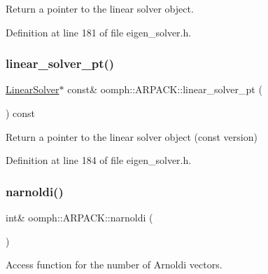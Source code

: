 Return a pointer to the linear solver object. 



Definition at line 181 of file eigen\+\_\+solver.\+h.

\mbox{\label{classoomph_1_1ARPACK_a48d9a6ff92914c0126dbfa85815b7d1f}} 
\subsubsection{\texorpdfstring{linear\+\_\+solver\+\_\+pt()}{linear\_solver\_pt()}\hspace{0.1cm}{\footnotesize\ttfamily [2/2]}}
{\footnotesize\ttfamily \hyperlink{classoomph_1_1LinearSolver}{Linear\+Solver}$\ast$ const\& oomph\+::\+A\+R\+P\+A\+C\+K\+::linear\+\_\+solver\+\_\+pt (\begin{DoxyParamCaption}{ }\end{DoxyParamCaption}) const\hspace{0.3cm}{\ttfamily [inline]}}



Return a pointer to the linear solver object (const version) 



Definition at line 184 of file eigen\+\_\+solver.\+h.

\mbox{\label{classoomph_1_1ARPACK_a4e398ee962b8843668a76904b3302bb0}} 
\subsubsection{\texorpdfstring{narnoldi()}{narnoldi()}\hspace{0.1cm}{\footnotesize\ttfamily [1/2]}}
{\footnotesize\ttfamily int\& oomph\+::\+A\+R\+P\+A\+C\+K\+::narnoldi (\begin{DoxyParamCaption}{ }\end{DoxyParamCaption})\hspace{0.3cm}{\ttfamily [inline]}}



Access function for the number of Arnoldi vectors. 



